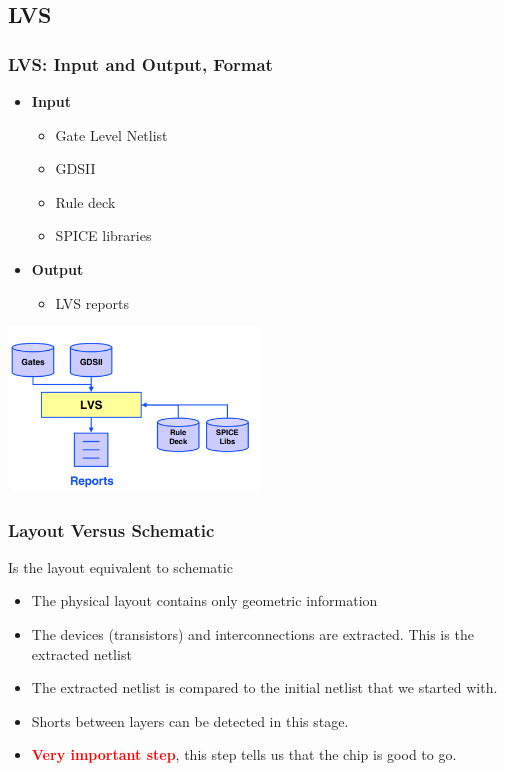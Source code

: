 \documentclass[compress]{beamer}
\begin{document}
\subsection[LVS]{LVS}
\begin{frame}
	\frametitle{LVS: Input and Output, Format}
	\begin{itemize}
		\item \textbf{Input}
		\begin{itemize}
			\item Gate Level Netlist
			\item GDSII
			\item Rule deck
			\item SPICE libraries
		\end{itemize}
		\item \textbf{Output}
		\begin{itemize}
			\item LVS reports
		\end{itemize}
	\end{itemize}
	\begin{center}
		\includegraphics[width=0.5\textwidth]{LVS}
	\end{center}
\end{frame}
\begin{frame}
	\frametitle{Layout Versus Schematic}

		\begin{block}{Is the layout equivalent to schematic}
			\begin{itemize}
				\item The physical layout contains only geometric information
				\item The devices (transistors) and interconnections are extracted.
				This is the extracted netlist
				\item The extracted netlist is compared to the initial netlist that we
				started with.
				\item Shorts between layers can be detected in this stage.
				\item \textcolor{red}{\textbf{Very important step}}, this step tells us that the chip is good
				to go.
			\end{itemize}
		\end{block}
\end{frame}
\end{document}
